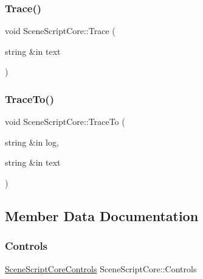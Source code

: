 \hypertarget{class_scene_script_core_a21423c73600939aaf59af192835d1097}{}\label{class_scene_script_core_a21423c73600939aaf59af192835d1097} 
\subsubsection{\texorpdfstring{Trace()}{Trace()}}
{\footnotesize\ttfamily void Scene\+Script\+Core\+::\+Trace (\begin{DoxyParamCaption}\item[{string \&in}]{text }\end{DoxyParamCaption})}

\hypertarget{class_scene_script_core_ad645f7350cf76eece5b0af42434e114c}{}\label{class_scene_script_core_ad645f7350cf76eece5b0af42434e114c} 
\subsubsection{\texorpdfstring{Trace\+To()}{TraceTo()}}
{\footnotesize\ttfamily void Scene\+Script\+Core\+::\+Trace\+To (\begin{DoxyParamCaption}\item[{string \&in}]{log,  }\item[{string \&in}]{text }\end{DoxyParamCaption})}



\subsection{Member Data Documentation}
\hypertarget{class_scene_script_core_ad533f6453f37d858257fa223b712d47a}{}\label{class_scene_script_core_ad533f6453f37d858257fa223b712d47a} 
\subsubsection{\texorpdfstring{Controls}{Controls}}
{\footnotesize\ttfamily \hyperlink{class_scene_script_core_controls}{Scene\+Script\+Core\+Controls} Scene\+Script\+Core\+::\+Controls}

\hypertarget{class_scene_script_core_a889e54da3108b4697a90082a1ccad83f}{}\label{class_scene_script_core_a889e54da3108b4697a90082a1ccad83f} 
